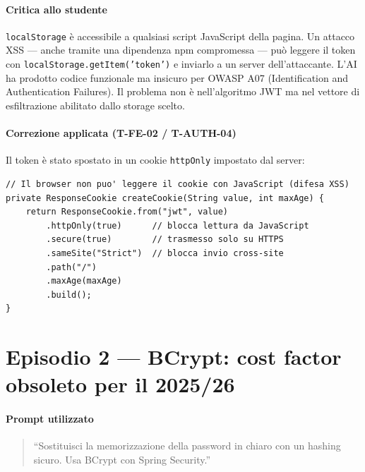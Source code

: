 ﻿\documentclass[a4paper,12pt]{report}
\begin{document}
\paragraph{Critica allo studente}
\texttt{localStorage} è accessibile a qualsiasi script JavaScript della pagina.
Un attacco XSS --- anche tramite una dipendenza npm compromessa --- può leggere
il token con \texttt{localStorage.getItem('token')} e inviarlo a un server
dell'attaccante. L'AI ha prodotto codice funzionale ma insicuro per OWASP A07
(Identification and Authentication Failures). Il problema non è nell'algoritmo
JWT ma nel vettore di esfiltrazione abilitato dallo storage scelto.

\paragraph{Correzione applicata (T-FE-02 / T-AUTH-04)}
Il token è stato spostato in un cookie \texttt{httpOnly} impostato dal server:

\begin{securebox}[title={Cookie httpOnly al posto di localStorage (T-FE-02)}]
\begin{lstlisting}[style=java]
// Il browser non puo' leggere il cookie con JavaScript (difesa XSS)
private ResponseCookie createCookie(String value, int maxAge) {
    return ResponseCookie.from("jwt", value)
        .httpOnly(true)      // blocca lettura da JavaScript
        .secure(true)        // trasmesso solo su HTTPS
        .sameSite("Strict")  // blocca invio cross-site
        .path("/")
        .maxAge(maxAge)
        .build();
}
\end{lstlisting}
\end{securebox}

\section{Episodio 2 --- BCrypt: cost factor obsoleto per il 2025/26}

\paragraph{Prompt utilizzato}
\begin{quote}
``Sostituisci la memorizzazione della password in chiaro con un hashing sicuro.
Usa BCrypt con Spring Security.''
\end{quote}
\end{document}
